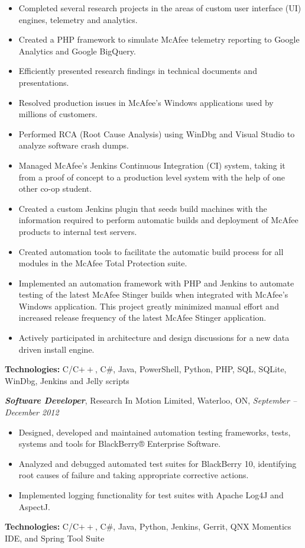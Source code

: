 \documentclass[10pt,letterpaper]{article}
\newcommand{\job}[4]
{
    \emph{\textbf{#1}}, #2, #3, \emph{#4}
}
\begin{document}
\begin{adjustwidth}{0.1in}{0.5in}
    \begin{itemize}
	\item Completed several research projects in the areas of custom user interface (UI) engines, telemetry and analytics.
    \item Created a PHP framework to simulate McAfee telemetry reporting to Google Analytics and Google BigQuery.
	\item Efficiently presented research findings in technical documents and presentations.
	\item Resolved production issues in McAfee's Windows applications used by millions of customers.
	\item Performed RCA (Root Cause Analysis) using WinDbg and Visual Studio to analyze software crash dumps.  
	\item Managed McAfee's Jenkins Continuous Integration (CI) system, taking it from a proof of concept to a production level system with the help 
	    of one other co-op student.
	\item Created a custom Jenkins plugin that seeds build machines with the information required to perform automatic builds and 
	    deployment of McAfee products to internal test servers.
	\item Created automation tools to facilitate the automatic build process for all modules in the 
	    McAfee Total Protection suite.
	\item Implemented an automation framework with PHP and Jenkins to automate testing of the latest McAfee Stinger builds when integrated  
	    with McAfee's Windows application. This project greatly minimized manual effort and increased release frequency of the latest McAfee Stinger application.  
    \item Actively participated in architecture and design discussions for a new data driven install engine.
    \end{itemize}
    \vspace{0.5em}
    \textbf{Technologies:} C/C$++$, C\#, Java, PowerShell, Python, PHP, SQL, SQLite, WinDbg, Jenkins and Jelly scripts
\end{adjustwidth}
\vspace{0.8em}
\job{Software Developer}{Research In Motion Limited}{Waterloo, ON}{September -- December 2012}\\
\begin{adjustwidth}{0.1in}{0.5in}
    \begin{itemize}
	\item Designed, developed and maintained automation testing frameworks, tests, systems and tools for 
	    BlackBerry® Enterprise Software.
	\item Analyzed and debugged automated test suites for BlackBerry 10, identifying root causes of failure and 
	    taking appropriate corrective actions.
	\item Implemented logging functionality for test suites with Apache Log4J and AspectJ.
    \end{itemize}
    \vspace{0.5em}
    \textbf{Technologies:} C/C$++$, C\#, Java, Python, Jenkins, Gerrit, QNX Momentics IDE, and Spring Tool Suite
\end{adjustwidth}
\end{document}
